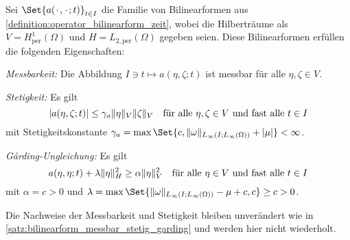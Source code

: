 \documentclass[../main.tex]{subfiles}
\begin{document}
\begin{Lemma}
\label{lemma:bilinearform_periodisch_messbar_stetig_garding}
    Sei $\Set{a(\blank, \blank; t)}_{t \in I}$ die Familie von Bilinearformen aus \cref{definition:operator_bilinearform_zeit}, wobei die Hilberträume als $V = H^{1}_{\mathrm{per}}(\Omega)$ und $H = L_{2,\mathrm{per}}(\Omega)$ gegeben seien.
    Diese Bilinearformen erfüllen die folgenden Eigenschaften:
    \begin{thmenumerate}
        \item \label{lemma:bilinearform_periodisch_messbar_stetig_garding:messbar}
        \emph{Messbarkeit:} Die Abbildung $I \ni t \mapsto a(\eta, \zeta; t)$ ist messbar für alle $\eta, \zeta \in V$.
        \item\label{lemma:bilinearform_periodisch_messbar_stetig_garding:stetig}
        \emph{Stetigkeit:} Es gilt
        \begin{equation}
            \label{eq:bilinearform_periodisch_messbar_stetig_garding:stetig}
            \abs{a(\eta, \zeta; t)} \leq \gamma_{a} \norm{\eta}_{V} \norm{\zeta}_{V} \quad \fa \eta, \zeta \in V \text{ und fast alle } t \in I
        \end{equation}
        mit Stetigkeitskonstante $\gamma_{a} = \max\Set{c, \norm{\omega}_{L_{\infty}(I; L_{\infty}(\Omega))} + \abs{\mu}} < \infty$.
        \item\label{lemma:bilinearform_periodisch_messbar_stetig_garding:garding}
        \emph{G\aa{}rding-Ungleichung:} Es gilt
        \begin{equation}
            \label{eq:bilinearform_periodisch_messbar_stetig_garding:garding}
            a(\eta, \eta; t) + \lambda \norm{\eta}_{H}^{2} \geq \alpha \norm{\eta}_{V}^{2} \quad \fa \eta \in V \text{ und fast alle } t \in I
        \end{equation}
        mit $\alpha = c > 0$ und $\lambda = \max\Set{\norm{\omega}_{L_{\infty}(I;L_{\infty}(\Omega))} - \mu + c, c} \geq c > 0$.
    \end{thmenumerate}

    \begin{Beweis}
        Die Nachweise der Messbarkeit und Stetigkeit bleiben unverändert wie in \cref{satz:bilinearform_messbar_stetig_garding} und werden hier nicht wiederholt.


\end{Beweis}
\end{Lemma}
\end{document}
